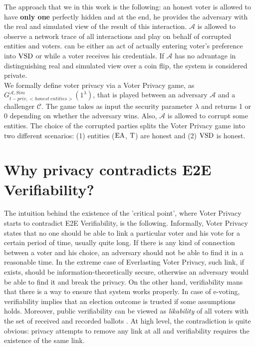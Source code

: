 The approach that we  in this work is the following: an honest voter is allowed to have  \textbf{only one} perfectly hidden  and at the end, he provides the adversary with the real and simulated view of the result of this interaction.  $\mathcal{A}$ is allowed to observe a network trace of all interactions and play on behalf of corrupted entities and voters.  can be either an act of actually entering voter's preference into $\operatorname{VSD}$ or while a voter receives his credentials. If $\mathcal{A}$  has no advantage in distinguishing real and simulated view over a coin flip, the system is considered private. \\

We formally define  voter privacy via a Voter Privacy game,  as $G_{t-priv,<honest~entities>}^{\mathcal{A}, Sim}(1^{\lambda})$, that is played between an adversary $\mathcal{A}$ and a challenger $\mathcal{C}$. The game takes as input the security parameter $\lambda$ and returns 1 or 0 depending on whether the adversary wins.  Also, $\mathcal{A}$ is  allowed to corrupt some entities. The choice of the corrupted parties splits the Voter Privacy game into two different scenarios: (1) entities ($\operatorname{EA}$, $\operatorname{T}$) are honest and (2) $\operatorname{VSD}$ is honest. 
\section{Why privacy contradicts E2E Verifiability?}
 The intuition behind the existence of the 'critical point',  where Voter Privacy starts to contradict E2E Verifiability, is the following. Informally, Voter Privacy states that no one should be able to link a particular voter and his vote for a certain period of time, usually quite long. If there is any kind of connection between a voter and his choice, an adversary should not be able to find it in a reasonable time.  In the extreme case of Everlasting Voter Privacy, such link, if exists, should be information-theoretically secure, otherwise an adversary would be able to find it and break the privacy.  On the other hand, verifiability mans that there is a way to ensure that system works properly. In case of e-voting, verifiability implies that an election outcome is trusted if some assumptions holds. Moreover, public verifiability can be viewed as \textit{likability} of all voters with the set of received and recorded ballots \cite{Langer2010}.  At  high level, the contradiction is quite obvious: privacy attempts to remove any link at all and verifiability requires the existence of the same link.  
